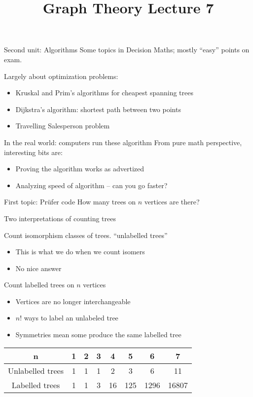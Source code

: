 \documentclass{beamer}
\title{Graph Theory Lecture 7}
\begin{document}
\begin{frame}{Second unit: Algorithms}
Some topics in Decision Maths; mostly ``easy'' points on exam.
  \begin{block}{Largely about optimization problems:}
    \begin{itemize}
    \item Kruskal and Prim's algorithms for cheapest spanning trees
    \item Dijkstra's algorithm: shortest path between two points
    \item Travelling Salesperson problem
    \end{itemize}
    \end{block}
  \begin{block}{In the real world: computers run these algorithm}
    From pure math perspective, interesting bits are:
    \begin{itemize}
    \item Proving the algorithm works as advertized
    \item Analyzing speed of algorithm -- can you go faster?
      \end{itemize}
    \end{block}


 \begin{block}{First topic: Pr\"ufer code}
    How many trees on $n$ vertices are there?
    \end{block}
\end{frame}

\begin{frame}{Two interpretations of counting trees}
\begin{block}{Count isomorphism classes of trees. ``unlabelled trees''}
\begin{itemize}
\item  This is what we do when we count isomers
\item No nice answer
\end{itemize}

\end{block}
\begin{block}{Count labelled trees on $n$ vertices}
\begin{itemize}
\item  Vertices are no longer interchangeable
\item $n!$ ways to label an unlabeled tree
  \item Symmetries mean some produce the same labelled tree
\end{itemize}
\end{block}
\begin{center}
\begin{tabular}{c|c|c|c|c|c|c|c}
n &  1 & 2 & 3 & 4 & 5 & 6 & 7 \\ \hline
Unlabelled trees &  1 & 1 & 1 & 2 & 3 & 6 & 11 \\ \hline
Labelled trees & 1 & 1 & 3 & 16 & 125 & 1296 & 16807
  \end{tabular}
\end{center}


\end{frame}
\end{document}
